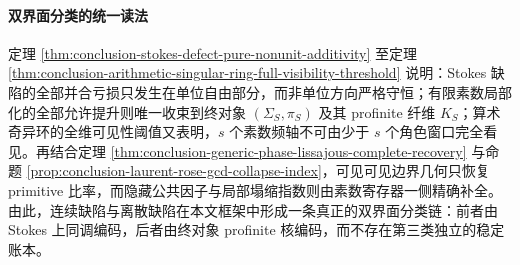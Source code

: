 \paragraph{双界面分类的统一读法}
定理 \ref{thm:conclusion-stokes-defect-pure-nonunit-additivity} 至定理 \ref{thm:conclusion-arithmetic-singular-ring-full-visibility-threshold} 说明：Stokes 缺陷的全部并合亏损只发生在单位自由部分，而非单位方向严格守恒；有限素数局部化的全部允许提升则唯一收束到终对象 \((\Sigma_S,\pi_S)\) 及其 profinite 纤维 \(K_S\)；算术奇异环的全维可见性阈值又表明，\(s\) 个素数频轴不可由少于 \(s\) 个角色窗口完全看见。再结合定理 \ref{thm:conclusion-generic-phase-lissajous-complete-recovery} 与命题 \ref{prop:conclusion-laurent-rose-gcd-collapse-index}，可见可见边界几何只恢复 primitive 比率，而隐藏公共因子与局部塌缩指数则由素数寄存器一侧精确补全。由此，连续缺陷与离散缺陷在本文框架中形成一条真正的双界面分类链：前者由 Stokes 上同调编码，后者由终对象 profinite 核编码，而不存在第三类独立的稳定账本。

\endinput
